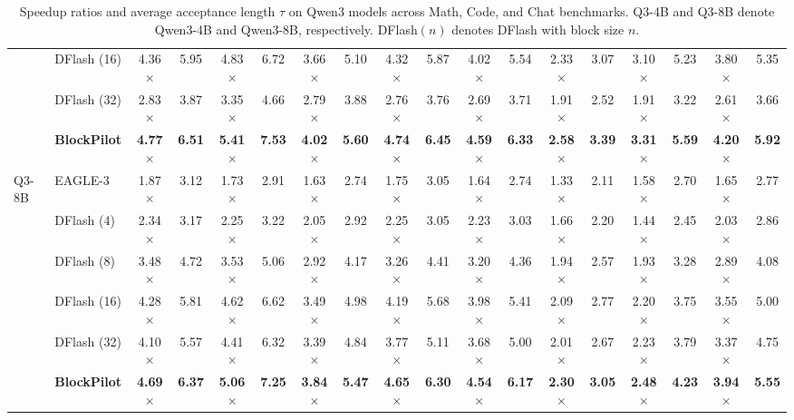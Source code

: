 \documentclass{llmxive}
\begin{document}
\begin{table}[t]
{\begin{tabular}{@{}ll*{8}{cc}@{}}
& DFlash (16) & 4.36$\times$ & 5.95 & 4.83$\times$ & 6.72 & 3.66$\times$ & 5.10 & 4.32$\times$ & 5.87 & 4.02$\times$ & 5.54 & 2.33$\times$ & 3.07 & 3.10$\times$ & 5.23 & 3.80$\times$ & 5.35 \\
& DFlash (32) & 2.83$\times$ & 3.87 & 3.35$\times$ & 4.66 & 2.79$\times$ & 3.88 & 2.76$\times$ & 3.76 & 2.69$\times$ & 3.71 & 1.91$\times$ & 2.52 & 1.91$\times$ & 3.22 & 2.61$\times$ & 3.66 \\
& \textbf{BlockPilot} & \textbf{4.77$\times$} & \textbf{6.51} & \textbf{5.41$\times$} & \textbf{7.53} & \textbf{4.02$\times$} & \textbf{5.60} & \textbf{4.74$\times$} & \textbf{6.45} & \textbf{4.59$\times$} & \textbf{6.33} & \textbf{2.58$\times$} & \textbf{3.39} & \textbf{3.31$\times$} & \textbf{5.59} & \textbf{4.20$\times$} & \textbf{5.92} \\
\midrule
\multirow{6}{*}{Q3-8B}
& EAGLE-3     & 1.87$\times$ & 3.12 & 1.73$\times$ & 2.91 & 1.63$\times$ & 2.74 & 1.75$\times$ & 3.05 & 1.64$\times$ & 2.74 & 1.33$\times$ & 2.11 & 1.58$\times$ & 2.70 & 1.65$\times$ & 2.77 \\
& DFlash (4)  & 2.34$\times$ & 3.17 & 2.25$\times$ & 3.22 & 2.05$\times$ & 2.92 & 2.25$\times$ & 3.05 & 2.23$\times$ & 3.03 & 1.66$\times$ & 2.20 & 1.44$\times$ & 2.45 & 2.03$\times$ & 2.86 \\
& DFlash (8)  & 3.48$\times$ & 4.72 & 3.53$\times$ & 5.06 & 2.92$\times$ & 4.17 & 3.26$\times$ & 4.41 & 3.20$\times$ & 4.36 & 1.94$\times$ & 2.57 & 1.93$\times$ & 3.28 & 2.89$\times$ & 4.08 \\
& DFlash (16) & 4.28$\times$ & 5.81 & 4.62$\times$ & 6.62 & 3.49$\times$ & 4.98 & 4.19$\times$ & 5.68 & 3.98$\times$ & 5.41 & 2.09$\times$ & 2.77 & 2.20$\times$ & 3.75 & 3.55$\times$ & 5.00 \\
& DFlash (32) & 4.10$\times$ & 5.57 & 4.41$\times$ & 6.32 & 3.39$\times$ & 4.84 & 3.77$\times$ & 5.11 & 3.68$\times$ & 5.00 & 2.01$\times$ & 2.67 & 2.23$\times$ & 3.79 & 3.37$\times$ & 4.75 \\
& \textbf{BlockPilot} & \textbf{4.69$\times$} & \textbf{6.37} & \textbf{5.06$\times$} & \textbf{7.25} & \textbf{3.84$\times$} & \textbf{5.47} & \textbf{4.65$\times$} & \textbf{6.30} & \textbf{4.54$\times$} & \textbf{6.17} & \textbf{2.30$\times$} & \textbf{3.05} & \textbf{2.48$\times$} & \textbf{4.23} & \textbf{3.94$\times$} & \textbf{5.55} \\
\bottomrule
\end{tabular}%
}
\caption{Speedup ratios and average acceptance length $\tau$ on Qwen3 models across Math, Code, and Chat benchmarks. Q3-4B and Q3-8B denote Qwen3-4B and Qwen3-8B, respectively. DFlash$(n)$ denotes DFlash with block size $n$.}
\label{tab:qwen3_speedup_acceptance}
\end{table}
\end{document}
